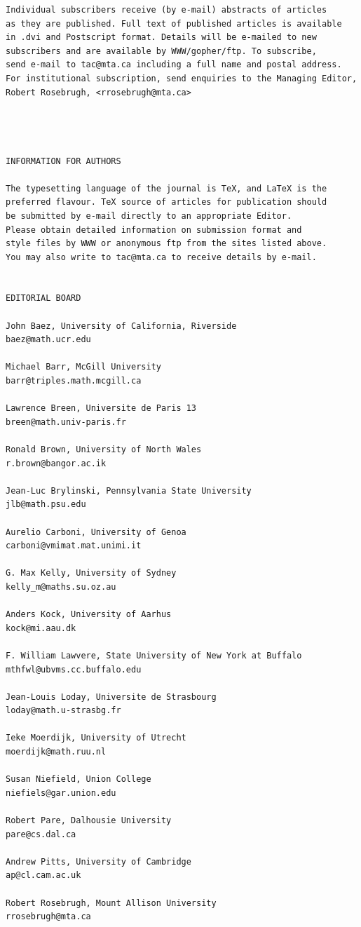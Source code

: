 \documentclass{article}
\begin{document}
\begin{verbatim}
Individual subscribers receive (by e-mail) abstracts of articles 
as they are published. Full text of published articles is available 
in .dvi and Postscript format. Details will be e-mailed to new 
subscribers and are available by WWW/gopher/ftp. To subscribe, 
send e-mail to tac@mta.ca including a full name and postal address. 
For institutional subscription, send enquiries to the Managing Editor, 
Robert Rosebrugh, <rrosebrugh@mta.ca>
 
 
 
 
INFORMATION FOR AUTHORS
 
The typesetting language of the journal is TeX, and LaTeX is the 
preferred flavour. TeX source of articles for publication should 
be submitted by e-mail directly to an appropriate Editor. 
Please obtain detailed information on submission format and 
style files by WWW or anonymous ftp from the sites listed above.
You may also write to tac@mta.ca to receive details by e-mail.
 
 
EDITORIAL BOARD
 
John Baez, University of California, Riverside
baez@math.ucr.edu
 
Michael Barr, McGill University
barr@triples.math.mcgill.ca
 
Lawrence Breen, Universite de Paris 13
breen@math.univ-paris.fr
 
Ronald Brown, University of North Wales 
r.brown@bangor.ac.ik
 
Jean-Luc Brylinski, Pennsylvania State University
jlb@math.psu.edu
 
Aurelio Carboni, University of Genoa
carboni@vmimat.mat.unimi.it
 
G. Max Kelly, University of Sydney
kelly_m@maths.su.oz.au
 
Anders Kock, University of Aarhus
kock@mi.aau.dk
 
F. William Lawvere, State University of New York at Buffalo
mthfwl@ubvms.cc.buffalo.edu
 
Jean-Louis Loday, Universite de Strasbourg
loday@math.u-strasbg.fr
 
Ieke Moerdijk, University of Utrecht
moerdijk@math.ruu.nl
 
Susan Niefield, Union College
niefiels@gar.union.edu
 
Robert Pare, Dalhousie University
pare@cs.dal.ca
 
Andrew Pitts, University of Cambridge
ap@cl.cam.ac.uk
 
Robert Rosebrugh, Mount Allison University
rrosebrugh@mta.ca
 

\end{verbatim}
\end{document}
